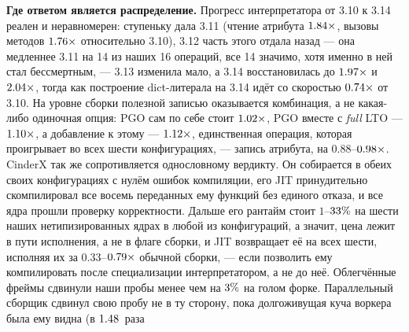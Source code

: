 \textbf{Где ответом является распределение.} Прогресс интерпретатора от 3.10 к 3.14 реален и
неравномерен: ступеньку дала 3.11 (чтение атрибута $\meas{ratio:b3_runtime-v310:attr_get/v310|b3_runtime-v311:attr_get/v311}{1.84}\times$, вызовы методов $\meas{ratio:b3_runtime-v310:method_call/v310|b3_runtime-v311:method_call/v311}{1.76}\times$
относительно 3.10), 3.12 часть этого отдала назад --- она медленнее 3.11 на 14 из наших 16
операций, все 14 значимо, хотя именно в ней  стал бессмертным, --- 3.13 изменила мало, а
3.14 восстановилась до $\meas{ratio:b3_runtime-v310:attr_get/v310|b3_runtime-v314:attr_get/v314}{1.97}\times$ и $\meas{ratio:b3_runtime-v310:method_call/v310|b3_runtime-v314:method_call/v314}{2.04}\times$, тогда как построение dict-литерала на 3.14 идёт
со скоростью $\meas{ratio:b3_runtime-v310:create_dict/v310|b3_runtime-v314:create_dict/v314}{0.74}\times$ от 3.10. На уровне сборки полезной записью оказывается комбинация, а не
какая-либо одиночная опция: PGO сам по себе стоит $\meas{geomean:b5_buildcfg-plain|b5_buildcfg-pgo}{1.02}\times$, PGO вместе с \emph{full} LTO ---
$\meas{geomean:b5_buildcfg-plain|b5_buildcfg-pgo_ltofull}{1.10}\times$, а добавление к этому  --- $\meas{geomean:b5_buildcfg-plain|b5_buildcfg-pgo_ltofull_native}{1.12}\times$, единственная операция,
которая проигрывает во всех шести конфигурациях, --- запись атрибута, на $0.88$--$\meas{ratio:b5_buildcfg-plain:attr_set/plain|b5_buildcfg-pgo:attr_set/pgo}{0.98}\times$.
CinderX так же
сопротивляется однословному вердикту. Он собирается в обеих своих конфигурациях с нулём ошибок
компиляции, его JIT принудительно скомпилировал все восемь переданных ему функций без единого
отказа, и все ядра прошли проверку корректности. Дальше его рантайм стоит $1$--$\meas{pct:b6_cinderx-fork_cinderx:mandelbrot/fork_cinderx|b6_cinderx-stock:mandelbrot/stock}{33}\%$ на шести
наших нетипизированных ядрах в любой из конфигураций, а значит, цена лежит в пути исполнения, а не
в флаге сборки, и JIT возвращает её на всех шести, исполняя их за $0.33$--$\meas{ratio:b6_cinderx-fork_jit:binarytrees/fork_jit|b6_cinderx-stock:binarytrees/stock}{0.79}\times$ обычной
сборки, --- если позволить ему компилировать после специализации интерпретатором, а не до неё.
Облегчённые фреймы сдвинули наши пробы менее чем на $\meas{pct:b6_cinderx-stock:traceback_depth_50/stock|b6_cinderx-fork:traceback_depth_50/fork}{3}\%$ на голом форке. Параллельный сборщик
сдвинул свою пробу не в ту сторону, пока долгоживущая куча воркера была ему видна (в $\meas{ratio:b6_gcscale-fork_cinderx:gc_collect/fork_cinderx/state_visible_par6|b6_gcscale-fork_cinderx:gc_collect/fork_cinderx/state_visible_serial}{1.48}$~раза
